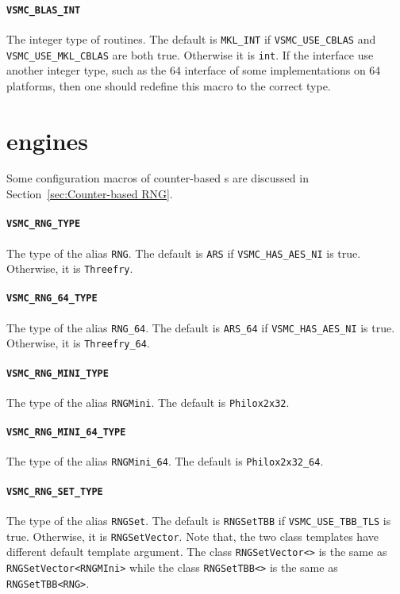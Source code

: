 \paragraph{\texttt{VSMC\_BLAS\_INT}} The integer type of \blas routines. The
default is \verb|MKL_INT| if \verb|VSMC_USE_CBLAS| and
\verb|VSMC_USE_MKL_CBLAS| are both true. Otherwise it is \verb|int|. If the
\blas interface use another integer type, such as the \ilp{}64 interface of
some implementations on \lp{}64 platforms, then one should redefine this macro
to the correct type.

\section{\protect\rng engines}
\label{sec:RNG engines}

Some configuration macros of counter-based \rng{}s are discussed in
Section~\ref{sec:Counter-based RNG}.

\paragraph{\texttt{VSMC\_RNG\_TYPE}} The type of the alias \verb|RNG|. The
default is \verb|ARS| if \verb|VSMC_HAS_AES_NI| is true. Otherwise, it is
\verb|Threefry|.

\paragraph{\texttt{VSMC\_RNG\_64\_TYPE}} The type of the alias \verb|RNG_64|.
The default is \verb|ARS_64| if \verb|VSMC_HAS_AES_NI| is true. Otherwise, it
is \verb|Threefry_64|.

\paragraph{\texttt{VSMC\_RNG\_MINI\_TYPE}} The type of the alias
\verb|RNGMini|.  The default is \verb|Philox2x32|.

\paragraph{\texttt{VSMC\_RNG\_MINI\_64\_TYPE}} The type of the alias
\verb|RNGMini_64|. The default is \verb|Philox2x32_64|.

\paragraph{\texttt{VSMC\_RNG\_SET\_TYPE}} The type of the alias \verb|RNGSet|.
The default is \verb|RNGSetTBB| if \verb|VSMC_USE_TBB_TLS| is true. Otherwise,
it is \verb|RNGSetVector|. Note that, the two class templates have different
default template argument. The class \verb|RNGSetVector<>| is the same as
\verb|RNGSetVector<RNGMIni>| while the class \verb|RNGSetTBB<>| is the same as
\verb|RNGSetTBB<RNG>|.

